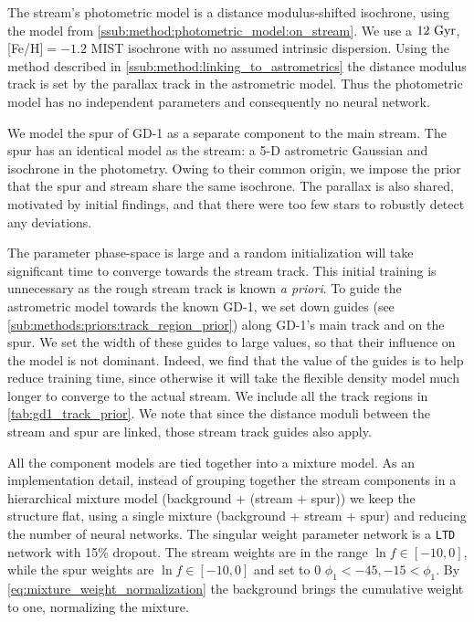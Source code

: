 \documentclass[twocolumn]{aastex631}
\newcommand{\stream}[1]{#1}
\begin{document}
        The stream's photometric model is a distance modulus-shifted isochrone,
        using the model from \autoref{ssub:method:photometric_model:on_stream}.
        We use a $12 \ \rm{Gyr}$, [Fe/H]$ = -1.2$ MIST isochrone with no assumed
        intrinsic dispersion.  Using the method described in
        \autoref{ssub:method:linking_to_astrometrics} the distance modulus track
        is set by the parallax track in the astrometric model. Thus the
        photometric model has no independent parameters and consequently no
        neural network.


        We model the spur of \stream{GD-1} as a separate component to the main
        stream. The spur has an identical model as the stream: a 5-D astrometric
        Gaussian and isochrone in the photometry. Owing to their common origin,
        we impose the prior that the spur and stream share the same isochrone.
        The parallax is also shared, motivated by initial findings, and that
        there were too few stars to robustly detect any deviations.


        The parameter phase-space is large and a random initialization will take
        significant time to converge towards the stream track. This initial
        training is unnecessary as the rough stream track is known \textit{a
        priori}.  To guide the astrometric model towards the known
        \stream{GD-1}, we set down guides (see
        \autoref{sub:methods:priors:track_region_prior}) along \stream{GD-1}'s
        main track and on the spur.  We set the width of these guides to large
        values, so that their influence on the model is not dominant. Indeed, we
        find that the value of the guides is to help reduce training time, since
        otherwise it will take the flexible density model much longer to
        converge to the actual stream.  We include all the track regions in
        \autoref{tab:gd1_track_prior}.  We note that since the distance moduli
        between the stream and spur are linked, those stream track guides also
        apply.

        All the component models are tied together into a mixture model.  As an
        implementation detail, instead of grouping together the stream
        components in a hierarchical mixture model (background + (stream +
        spur)) we keep the structure flat, using a single mixture (background +
        stream + spur) and reducing the number of neural networks. The singular
        weight parameter network is a \texttt{LTD} network with 15\% dropout.
        The stream weights are in the range $\ln f \in [-10, 0]$, while the spur
        weights are $\ln f \in [-10, 0]$ and set to 0 $\phi_1 < -45, -15 <
        \phi_1$. By \autoref{eq:mixture_weight_normalization} the background
        brings the cumulative weight to one, normalizing the mixture.
\end{document}
